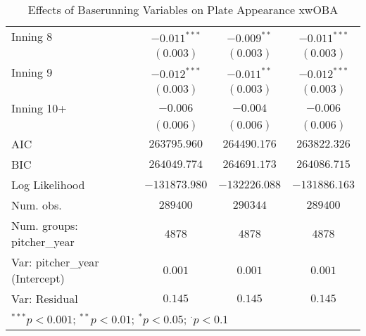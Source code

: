 \begin{table}
\begin{center}
\begin{tabular}{l c c c}
Inning 8                       & $-0.011^{***}$ & $-0.009^{**}$  & $-0.011^{***}$   \\
                               & $(0.003)$      & $(0.003)$      & $(0.003)$        \\
Inning 9                       & $-0.012^{***}$ & $-0.011^{**}$  & $-0.012^{***}$   \\
                               & $(0.003)$      & $(0.003)$      & $(0.003)$        \\
Inning 10+                     & $-0.006$       & $-0.004$       & $-0.006$         \\
                               & $(0.006)$      & $(0.006)$      & $(0.006)$        \\
\midrule
AIC                            & $263795.960$   & $264490.176$   & $263822.326$     \\
BIC                            & $264049.774$   & $264691.173$   & $264086.715$     \\
Log Likelihood                 & $-131873.980$  & $-132226.088$  & $-131886.163$    \\
Num. obs.                      & $289400$       & $290344$       & $289400$         \\
Num. groups: pitcher\_year     & $4878$         & $4878$         & $4878$           \\
Var: pitcher\_year (Intercept) & $0.001$        & $0.001$        & $0.001$          \\
Var: Residual                  & $0.145$        & $0.145$        & $0.145$          \\
\bottomrule
\multicolumn{4}{l}{\scriptsize{$^{***}p<0.001$; $^{**}p<0.01$; $^{*}p<0.05$; $^{\cdot}p<0.1$}}
\end{tabular}
\caption{Effects of Baserunning Variables on Plate Appearance xwOBA}
\label{tab:baserunning_models}
\end{center}
\end{table}

